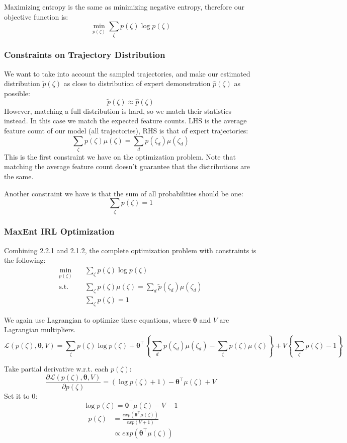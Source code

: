 \documentclass[11pt]{article}
\begin{document}
Maximizing entropy is the same as minimizing negative entropy, therefore our objective function is:
\[ \mathop{min}_{p(\zeta)} \sum_{\zeta}p(\zeta) \log p(\zeta) \]

\subsubsection{Constraints on Trajectory Distribution}
We want to take into account the sampled trajectories, and make our estimated distribution $\tilde{p}(\zeta)$ as close to distribution of expert demonstration $\hat{p}(\zeta)$ as possible:
\[ \tilde{p}(\zeta) \approx \hat{p}(\zeta) \]
However, matching a full distribution is hard, so we match their statistics instead. In this case we match the expected feature counts. LHS is the average feature count of our model (all trajectories), RHS is that of expert trajectories:
\[ \sum_\zeta p(\zeta) \mu(\zeta) = \sum_d p(\zeta_d) \mu(\zeta_d) \]
This is the first constraint we have on the optimization problem. Note that matching the average feature count doesn't guarantee that the distributions are the same.

Another constraint we have is that the sum of all probabilities should be one:
\[ \sum_\zeta p(\zeta) = 1 \]

\subsubsection{MaxEnt IRL Optimization}
Combining 2.2.1 and 2.1.2, the complete optimization problem with constraints is the following:
\begin{align*}
    \min_{p(\zeta)} \quad & \sum_\zeta p(\zeta) \log p(\zeta)\\
    \textrm{s.t.} \quad & \sum_\zeta p(\zeta) \mu(\zeta) = \sum_d \tilde{p}(\zeta_d) \mu(\zeta_d) \\
    \quad & \sum_\zeta p(\zeta) = 1
\end{align*}

We again use Lagrangian to optimize these equations, where $\boldsymbol\theta$ and $V$ are Lagrangian multipliers.
\[ \mathcal{L}(p(\zeta), \boldsymbol\theta, V) = \sum_\zeta p(\zeta) \log p(\zeta) + \boldsymbol\theta^\intercal \left\{ \sum_d p(\zeta_d) \mu(\zeta_d) - \sum_\zeta p(\zeta) \mu(\zeta) \right\} + V \left\{ \sum_\zeta p(\zeta) - 1 \right\} \]

Take partial derivative w.r.t. each $p(\zeta)$:
\[ \frac{\partial \mathcal{L}(p(\zeta), \boldsymbol\theta, V)}{\partial p(\zeta)} = (\log p(\zeta) + 1) - \boldsymbol\theta^\intercal \mu(\zeta) + V \]
Set it to 0:
\[ \log p(\zeta) = \boldsymbol\theta^\intercal \mu(\zeta) - V - 1 \]
\begin{align*}
p(\zeta) &= \frac{exp(\boldsymbol\theta^\intercal \mu(\zeta))}{exp(V+1)} \\
&\propto exp(\boldsymbol\theta^\intercal \mu(\zeta))
\end{align*}
\end{document}
